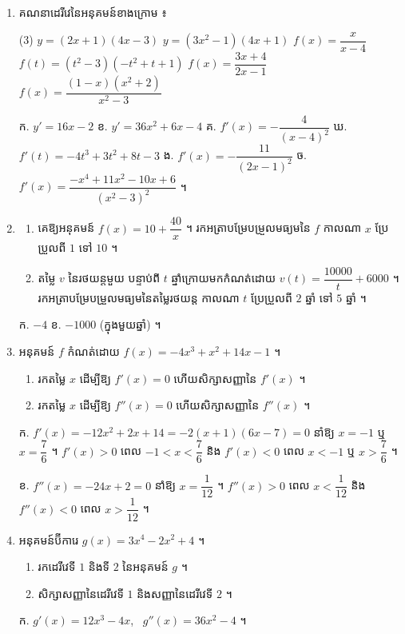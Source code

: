 \begin{enumerate}[1]
  \item គណនាដេរីវេនៃអនុគមន៍ខាងក្រោម ៖
  \begin{tasks}(3)
    \task $y = (2x + 1)(4x - 3)$
    \task $y = (3x^2 - 1)(4x + 1)$
    \task $f(x) = \dfrac{x}{x - 4}$
    \task $f(t) = (t^2 - 3)(-t^2 + t + 1)$
    \task $f(x) = \dfrac{3x + 4}{2x - 1}$
    \task $f(x) = \dfrac{(1 - x)(x^2 + 2)}{x^2 - 3}$
  \end{tasks}
  \ans
  ក. $y' = 16x - 2$ \quad ខ. $y' = 36x^2 + 6x - 4$ \quad គ. $f'(x) = -\dfrac{4}{(x - 4)^2}$ \quad ឃ. $f'(t) = -4t^3 + 3t^2 + 8t - 3$ \quad ង. $f'(x) = -\dfrac{11}{(2x - 1)^2}$ \quad ច. $f'(x) = \dfrac{-x^4 + 11x^2 - 10x + 6}{(x^2 - 3)^2}$ ។
  \item \begin{enumerate}[a]
    \item គេឱ្យអនុគមន៍ $f(x) = 10 + \dfrac{40}{x}$ ។ រកអត្រាបម្រែបម្រួលមធ្យមនៃ $f$ កាលណា $x$ ប្រែប្រួលពី $1$ ទៅ $10$ ។
    \item តម្លៃ $v$ នៃរថយន្តមួយ បន្ទាប់ពី $t$ ឆ្នាំក្រោយមកកំណត់ដោយ $v(t) = \dfrac{10000}{t} + 6000$ ។ រកអត្រាបម្រែបម្រួលមធ្យមនៃតម្លៃរថយន្ត កាលណា $t$ ប្រែប្រួលពី $2$ ឆ្នាំ ទៅ $5$ ឆ្នាំ ។
  \end{enumerate}
  \ans
  ក. $-4$ \quad ខ. $-1000$ (ក្នុងមួយឆ្នាំ) ។
  \item អនុគមន៍ $f$ កំណត់ដោយ $f(x) = -4x^3 + x^2 + 14x - 1$ ។
  \begin{enumerate}[a]
    \item រកតម្លៃ $x$ ដើម្បីឱ្យ $f'(x) = 0$ ហើយសិក្សាសញ្ញានៃ $f'(x)$ ។
    \item រកតម្លៃ $x$ ដើម្បីឱ្យ $f''(x) = 0$ ហើយសិក្សាសញ្ញានៃ $f''(x)$ ។
  \end{enumerate}
  \ans
  ក. $f'(x) = -12x^2 + 2x + 14 = -2(x + 1)(6x - 7) = 0$ នាំឱ្យ $x = -1$ ឬ $x = \dfrac{7}{6}$ ។ $f'(x) > 0$ ពេល $-1 < x < \dfrac{7}{6}$ និង $f'(x) < 0$ ពេល $x < -1$ ឬ $x > \dfrac{7}{6}$ ។

  ខ. $f''(x) = -24x + 2 = 0$ នាំឱ្យ $x = \dfrac{1}{12}$ ។ $f''(x) > 0$ ពេល $x < \dfrac{1}{12}$ និង $f''(x) < 0$ ពេល $x > \dfrac{1}{12}$ ។
  \item អនុគមន៍ប៊ីការេ $g(x) = 3x^4 - 2x^2 + 4$ ។
  \begin{enumerate}[a]
    \item រកដេរីវេទី $1$ និងទី $2$ នៃអនុគមន៍ $g$ ។
    \item សិក្សាសញ្ញានៃដេរីវេទី $1$ និងសញ្ញានៃដេរីវេទី $2$ ។
  \end{enumerate}
  \ans
  ក. $g'(x) = 12x^3 - 4x$, \ $g''(x) = 36x^2 - 4$ ។


\end{enumerate}
